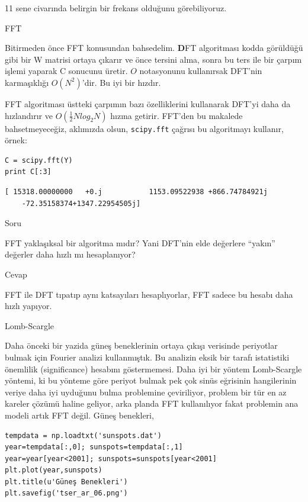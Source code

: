 \documentclass[12pt,fleqn]{article}\usepackage{../../common}
\begin{document}
11 sene civarında belirgin bir frekans olduğunu görebiliyoruz. 

FFT

Bitirmeden önce FFT konusundan bahsedelim. $\textbf{D}$FT algoritması kodda
görüldüğü gibi bir W matrisi ortaya çıkarır ve önce tersini alma, sonra bu ters
ile bir çarpım işlemi yaparak C sonucunu üretir. $O$ notasyonunu kullanırsak
DFT'nin karmaşıklığı $O(N^2)$'dir. Bu iyi bir hızdır.

FFT algoritması üstteki çarpımın bazı özelliklerini kullanarak DFT'yi daha
da hızlandırır ve $O(\frac{1}{2}Nlog_2N)$ hızına getirir. FFT'den bu
makalede bahsetmeyeceğiz, aklımızda olsun, \verb!scipy.fft! çağrısı bu
algoritmayı kullanır, örnek:

\begin{verbatim}
C = scipy.fft(Y)
print C[:3]
\end{verbatim}

\begin{verbatim}
[ 15318.00000000   +0.j           1153.09522938 +866.74784921j
    -72.35158374+1347.22954505j]
\end{verbatim}

Soru

FFT yaklaşıksal bir algoritma mıdır? Yani DFT'nin elde değerlere ``yakın''
değerler daha hızlı mı hesaplanıyor? 

Cevap

FFT ile DFT tıpatıp aynı katsayıları hesaplıyorlar, FFT sadece bu hesabı
daha hızlı yapıyor.

Lomb-Scargle

Daha önceki bir yazida güneş beneklerinin ortaya çıkışı verisinde
periyotlar bulmak için Fourier analizi kullanmıştık. Bu analizin eksik bir
tarafı istatistiki önemlilik (significance) hesabını göstermemesi. Daha iyi
bir yöntem Lomb-Scargle yöntemi, ki bu yönteme göre periyot bulmak pek çok
sinüs eğrisinin hangilerinin veriye daha iyi uyduğunu bulma problemine
çeviriliyor, problem bir tür en az kareler çözümü haline geliyor, arka
planda FFT kullanılıyor fakat problemin ana modeli artık FFT değil. Güneş
benekleri,

\begin{verbatim}
tempdata = np.loadtxt('sunspots.dat')
year=tempdata[:,0]; sunspots=tempdata[:,1]
year=year[year<2001]; sunspots=sunspots[year<2001]
plt.plot(year,sunspots)
plt.title(u'Güneş Benekleri')
plt.savefig('tser_ar_06.png')
\end{verbatim}
\end{document}
